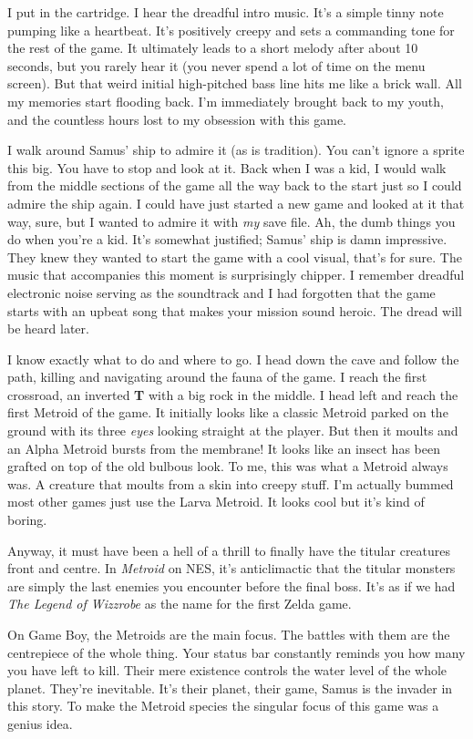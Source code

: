 \documentclass{book}
\begin{document}
I put in the cartridge. I hear the dreadful intro music. It’s a simple tinny note pumping like a heartbeat. It’s positively creepy and sets a commanding tone for the rest of the game. It ultimately leads to a short melody after about 10 seconds, but you rarely hear it (you never spend a lot of time on the menu screen). But that weird initial high-pitched bass line hits me like a brick wall. All my memories start flooding back. I’m immediately brought back to my youth, and the countless hours lost to my obsession with this game.\par
I walk around Samus’ ship to admire it (as is tradition). You can’t ignore a sprite this big. You have to stop and look at it. Back when I was a kid, I would walk from the middle sections of the game all the way back to the start just so I could admire the ship again. I could have just started a new game and looked at it that way, sure, but I wanted to admire it with \emph{my} save file. Ah, the dumb things you do when you’re a kid. It’s somewhat justified; Samus’ ship is damn impressive. They knew they wanted to start the game with a cool visual, that’s for sure. The music that accompanies this moment is surprisingly chipper. I remember dreadful electronic noise serving as the soundtrack and I had forgotten that the game starts with an upbeat song that makes your mission sound heroic. The dread will be heard later.\par
I know exactly what to do and where to go. I head down the cave and follow the path, killing and navigating around the fauna of the game. I reach the first crossroad, an inverted \textbf{T} with a big rock in the middle. I head left and reach the first Metroid of the game. It initially looks like a classic Metroid parked on the ground with its three \emph{eyes} looking straight at the player. But then it moults and an Alpha Metroid bursts from the membrane! It looks like an insect has been grafted on top of the old bulbous look. To me, this was what a Metroid always was. A creature that moults from a skin into creepy stuff. I’m actually bummed most other games just use the Larva Metroid. It looks cool but it’s kind of boring.\par
Anyway, it must have been a hell of a thrill to finally have the titular creatures front and centre. In \emph{Metroid} on NES, it’s anticlimactic that the titular monsters are simply the last enemies you encounter before the final boss. It’s as if we had \emph{The Legend of Wizzrobe} as the name for the first Zelda game.\par
On Game Boy, the Metroids are the main focus. The battles with them are the centrepiece of the whole thing. Your status bar constantly reminds you how many you have left to kill. Their mere existence controls the water level of the whole planet. They’re inevitable. It’s their planet, their game, Samus is the invader in this story. To make the Metroid species the singular focus of this game was a genius idea.\par
\end{document}
